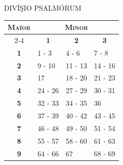 \vfill

\begin{center}
\vspace*{-1.0\baselineskip}
{\formatTextPsalmChapter DIVÍŞIO PSALMÓRUM}
\end{center}


\begin{center}
\end{center}

{
  \begin{table}[h]
  \centering
  \begin{tabular}{|cccc|}
  \hline
  \multicolumn{1}{|c|}{\multirow{2}{*}{\textbf{\textsc{Maïor}}}} & \multicolumn{3}{c|}{\textbf{\textsc{Minor}}}   \\ \cline{2-4}
  \multicolumn{1}{|c|}{}   & \multicolumn{1}{c|}{\textbf{1}} & \multicolumn{1}{c|}{\textbf{2}} & \multicolumn{1}{c|}{\textbf{3}} \\ \hline
  \multicolumn{1}{|c|}{\textbf{1}}  & \multicolumn{1}{l|}{1 - 3} & \multicolumn{1}{l|}{4 - 6} & \multicolumn{1}{l|}{7 - 8} \\ \hline
  \multicolumn{1}{|c|}{\textbf{2}}  & \multicolumn{1}{l|}{9 - 10} & \multicolumn{1}{l|}{11 - 13} & \multicolumn{1}{l|}{14 - 16} \\ \hline
  \multicolumn{1}{|c|}{\textbf{3}}  & \multicolumn{1}{l|}{17} & \multicolumn{1}{l|}{18 - 20} & \multicolumn{1}{l|}{21 - 23} \\ \hline
  \multicolumn{1}{|c|}{\textbf{4}}  & \multicolumn{1}{l|}{24 - 26} & \multicolumn{1}{l|}{27 - 29} & \multicolumn{1}{l|}{30 - 31} \\ \hline
  \multicolumn{1}{|c|}{\textbf{5}}  & \multicolumn{1}{l|}{32 - 33} & \multicolumn{1}{l|}{34 - 35} & \multicolumn{1}{l|}{36} \\ \hline
  \multicolumn{1}{|c|}{\textbf{6}}  & \multicolumn{1}{l|}{37 - 39} & \multicolumn{1}{l|}{40 - 42} & \multicolumn{1}{l|}{43 - 45} \\ \hline
  \multicolumn{1}{|c|}{\textbf{7}}  & \multicolumn{1}{l|}{46 - 48} & \multicolumn{1}{l|}{49 - 50} & \multicolumn{1}{l|}{51 - 54} \\ \hline
  \multicolumn{1}{|c|}{\textbf{8}}  & \multicolumn{1}{l|}{55 - 57} & \multicolumn{1}{l|}{58 - 60} & \multicolumn{1}{l|}{61 - 63} \\ \hline
  \multicolumn{1}{|c|}{\textbf{9}}  & \multicolumn{1}{l|}{64 - 66} & \multicolumn{1}{l|}{67} & \multicolumn{1}{l|}{68 - 69} \\ \hline

\end{tabular}
\end{table}}
